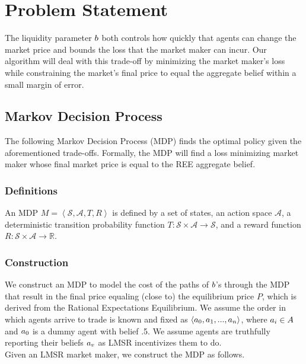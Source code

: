 \section{Problem Statement}
The liquidity parameter $b$ both controls how quickly that agents can change the market price and bounds the loss that the market maker can incur. Our algorithm will deal with this trade-off by minimizing the market maker's loss while constraining the market's final price to equal the aggregate belief within a small margin of error.\\

\subsection{Markov Decision Process}
The following Markov Decision Process (MDP) finds the optimal policy given the aforementioned trade-offs. Formally, the MDP will find a loss minimizing market maker whose final market price is equal to the REE aggregate belief. 

\subsubsection{Definitions}
An MDP $M=\left<\mathcal{S}, \mathcal{A}, T, R\right>$ is defined by a set of states, an action space $\mathcal{A}$, a deterministic transition probability function $T: \mathcal{S} \times \mathcal{A} \rightarrow \mathcal{S}$, and a reward function $R: \mathcal{S} \times \mathcal{A} \rightarrow \mathbb{R}$.\\

\subsubsection{Construction}
We construct an MDP to model the cost of the paths of $b$'s through the MDP that result in the final price equaling (close to) the equilibrium price $P$, which is derived from the Rational Expectations Equilibrium. We assume the order in which agents arrive to trade is known and fixed as $\left<a_0, a_1, ..., a_n\right>$, where $a_i \in A$ and $a_0$ is a dummy agent with belief .5. We assume agents are truthfully reporting their beliefs $a_v$ as LMSR incentivizes them to do.\\ 

Given an LMSR market maker, we construct the MDP as follows.\\

